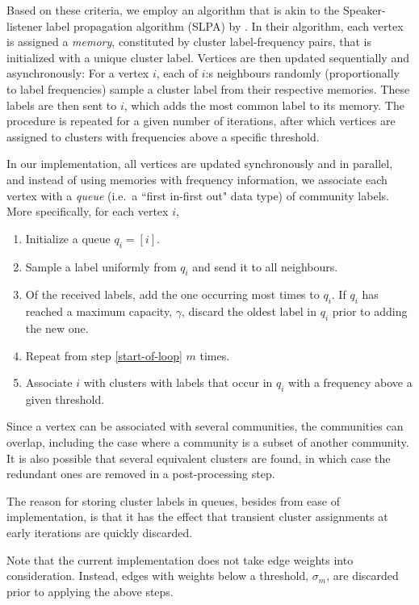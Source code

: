 \documentclass{kais}
\begin{document}
Based on these criteria, we employ an algorithm that is akin to the Speaker-listener
label propagation algorithm (SLPA) by . In their algorithm, each vertex is assigned
a \emph{memory}, constituted by cluster label-frequency pairs, that is initialized with a unique cluster label. Vertices
are then updated sequentially and asynchronously: For a vertex $i$, each of $i$:s neighbours randomly 
(proportionally to label frequencies) sample a cluster label from their respective memories. These labels are then
sent to $i$, which adds the most common label to its memory. The procedure is repeated for a given number of 
iterations, after which vertices are assigned to clusters with frequencies above a specific threshold. 

In our implementation, all vertices are updated synchronously and in parallel, and instead of using
memories with frequency information, we associate each vertex with a \emph{queue} (i.e.\ a ``first in-first out" data type)
of community labels. More specifically, for each vertex $i$,
\begin{enumerate}
\item Initialize a queue $q_i = [i]$.
\item \label{start-of-loop} Sample a label uniformly from $q_i$ and send it to all neighbours.
\item \label{add-label} Of the received labels, add the one occurring most times to $q_i$. If $q_i$ has reached a maximum 
capacity, $\gamma$, discard the oldest label in $q_i$ prior to adding the new one. 
\item Repeat from step \ref{start-of-loop} $m$ times.
\item Associate $i$ with clusters with labels that occur in $q_i$ with a frequency above a given threshold.
\end{enumerate}
Since a vertex can be associated with several communities, the communities can overlap, including
the case where a community is a subset of another community. It is also possible that several equivalent clusters
are found, in which case the redundant ones are removed in a post-processing step.

The reason for storing cluster labels in queues, besides from ease of implementation, is that it has the effect 
that transient cluster assignments at early iterations are quickly discarded. 

Note that the current implementation does not take edge weights into consideration. Instead, edges with
weights below a threshold, $\sigma_m$, are discarded prior to applying the above steps. 
\end{document}

